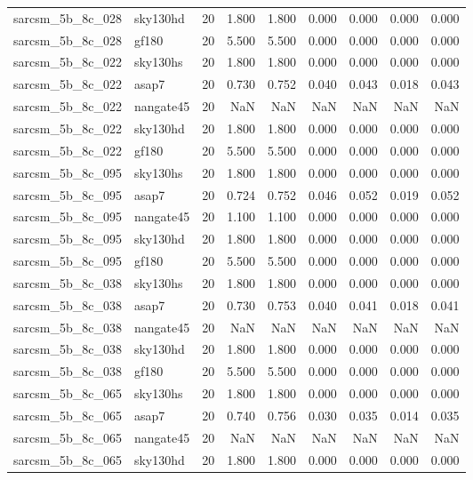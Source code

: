 \begin{tabular}{llrrrrrrr}
sarcsm\_5b\_8c\_028 & sky130hd & 20 & 1.800 & 1.800 & 0.000 & 0.000 & 0.000 & 0.000 \\
sarcsm\_5b\_8c\_028 & gf180 & 20 & 5.500 & 5.500 & 0.000 & 0.000 & 0.000 & 0.000 \\
sarcsm\_5b\_8c\_022 & sky130hs & 20 & 1.800 & 1.800 & 0.000 & 0.000 & 0.000 & 0.000 \\
sarcsm\_5b\_8c\_022 & asap7 & 20 & 0.730 & 0.752 & 0.040 & 0.043 & 0.018 & 0.043 \\
sarcsm\_5b\_8c\_022 & nangate45 & 20 & NaN & NaN & NaN & NaN & NaN & NaN \\
sarcsm\_5b\_8c\_022 & sky130hd & 20 & 1.800 & 1.800 & 0.000 & 0.000 & 0.000 & 0.000 \\
sarcsm\_5b\_8c\_022 & gf180 & 20 & 5.500 & 5.500 & 0.000 & 0.000 & 0.000 & 0.000 \\
sarcsm\_5b\_8c\_095 & sky130hs & 20 & 1.800 & 1.800 & 0.000 & 0.000 & 0.000 & 0.000 \\
sarcsm\_5b\_8c\_095 & asap7 & 20 & 0.724 & 0.752 & 0.046 & 0.052 & 0.019 & 0.052 \\
sarcsm\_5b\_8c\_095 & nangate45 & 20 & 1.100 & 1.100 & 0.000 & 0.000 & 0.000 & 0.000 \\
sarcsm\_5b\_8c\_095 & sky130hd & 20 & 1.800 & 1.800 & 0.000 & 0.000 & 0.000 & 0.000 \\
sarcsm\_5b\_8c\_095 & gf180 & 20 & 5.500 & 5.500 & 0.000 & 0.000 & 0.000 & 0.000 \\
sarcsm\_5b\_8c\_038 & sky130hs & 20 & 1.800 & 1.800 & 0.000 & 0.000 & 0.000 & 0.000 \\
sarcsm\_5b\_8c\_038 & asap7 & 20 & 0.730 & 0.753 & 0.040 & 0.041 & 0.018 & 0.041 \\
sarcsm\_5b\_8c\_038 & nangate45 & 20 & NaN & NaN & NaN & NaN & NaN & NaN \\
sarcsm\_5b\_8c\_038 & sky130hd & 20 & 1.800 & 1.800 & 0.000 & 0.000 & 0.000 & 0.000 \\
sarcsm\_5b\_8c\_038 & gf180 & 20 & 5.500 & 5.500 & 0.000 & 0.000 & 0.000 & 0.000 \\
sarcsm\_5b\_8c\_065 & sky130hs & 20 & 1.800 & 1.800 & 0.000 & 0.000 & 0.000 & 0.000 \\
sarcsm\_5b\_8c\_065 & asap7 & 20 & 0.740 & 0.756 & 0.030 & 0.035 & 0.014 & 0.035 \\
sarcsm\_5b\_8c\_065 & nangate45 & 20 & NaN & NaN & NaN & NaN & NaN & NaN \\
sarcsm\_5b\_8c\_065 & sky130hd & 20 & 1.800 & 1.800 & 0.000 & 0.000 & 0.000 & 0.000 \\

\end{tabular}
